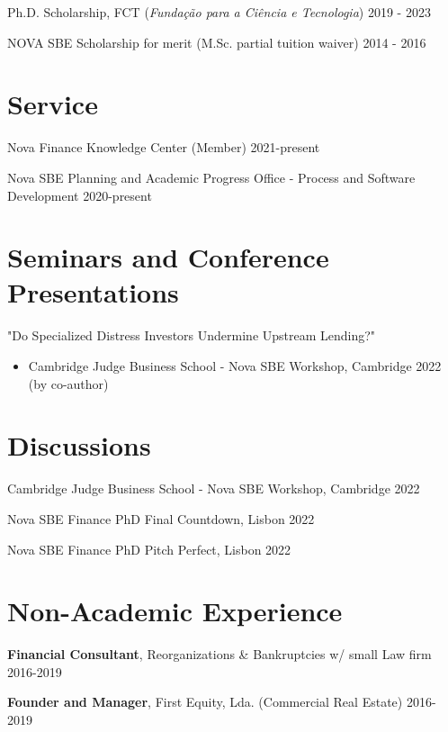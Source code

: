 \documentclass[letterpaper]{article}
\newenvironment{itemize*}{
  \begin{list}{}{
    \setlength{\leftmargin}{1.5em}
  }
}{
  \end{list}
}
\begin{document}
\begin{itemize*}
\item Ph.D. Scholarship, FCT (\textit{Fundação para a Ciência e Tecnologia}) \hfill 2019 - 2023
\item NOVA SBE Scholarship for merit (M.Sc. partial tuition waiver) \hfill 2014 - 2016
\end{itemize*}

\section*{Service}
\begin{itemize*}
\item Nova Finance Knowledge Center (Member) \hfill 2021-present
\item Nova SBE Planning and Academic Progress Office - Process and Software Development \hfill 2020-present
\end{itemize*}

\section*{Seminars and Conference Presentations}
\begin{itemize*}
\item "Do Specialized Distress Investors Undermine Upstream Lending?"
\begin{itemize}
\item Cambridge Judge Business School - Nova SBE Workshop,  Cambridge 2022 (by co-author)
\end{itemize}
\end{itemize*}

\section*{Discussions}
\begin{itemize*}
\item Cambridge Judge Business School - Nova SBE Workshop,  Cambridge 2022
\item Nova SBE Finance PhD Final Countdown, Lisbon 2022
\item Nova SBE Finance PhD Pitch Perfect, Lisbon 2022
\end{itemize*}

\section*{Non-Academic Experience}

\begin{itemize*}
\item \textbf{Financial Consultant}, Reorganizations \& Bankruptcies w/ small Law firm \hfill 2016-2019
\item \textbf{Founder and Manager}, First Equity, Lda. (Commercial Real Estate) \hfill 2016-2019
\end{itemize*}
\end{document}
